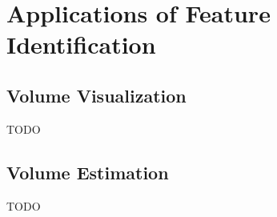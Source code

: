 \chapter{Applications of Feature Identification}
\label{chap:appendixapps}

\section{Volume Visualization}

TODO

\section{Volume Estimation}

TODO
